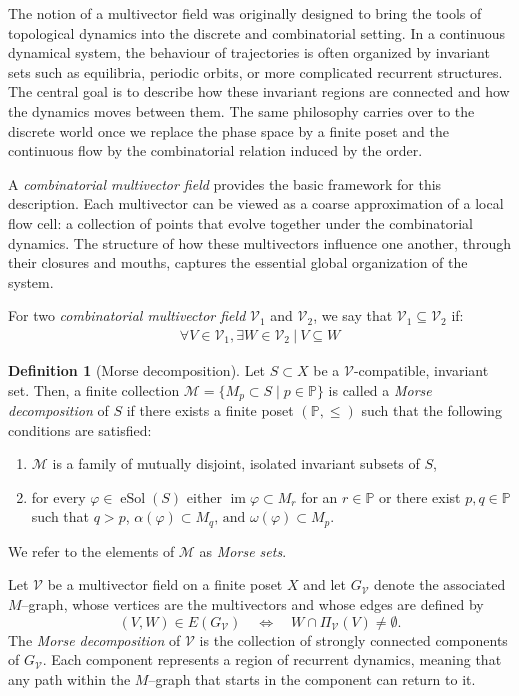 \documentclass{article}
\theoremstyle{definition}
\newtheorem{definition}{Definition}
\theoremstyle{plain}
\theoremstyle{remark}
\newcommand{\1}{\mathbbm{1}}  %
\newcommand{\img}{\operatorname{im}}
\newcommand{\esol}{\operatorname{eSol}}
\def\cV{\text{$\mathcal V$}}
\begin{document}
The notion of a multivector field was originally designed to bring the
tools of topological dynamics into the discrete and combinatorial
setting.  In a continuous dynamical system, the behaviour of trajectories
is often organized by invariant sets such as equilibria, periodic
orbits, or more complicated recurrent structures.  The central goal is
to describe how these invariant regions are connected and how the
dynamics moves between them.  The same philosophy carries over to the
discrete world once we replace the phase space by a finite poset and the
continuous flow by the combinatorial relation induced by the order.

A \emph{combinatorial multivector field} provides the basic framework for
this description.  Each multivector can be viewed as a coarse
approximation of a local flow cell: a collection of points that evolve
together under the combinatorial dynamics.  The structure of how these
multivectors influence one another, through their closures and mouths,
captures the essential global organization of the system.

For two \emph{combinatorial multivector field} $\mathcal{V}_1$ and $\mathcal{V}_2$, we say that $\mathcal{V}_1\subseteq\mathcal{V}_2$ if:
\begin{align*}
    \forall V \in \mathcal{V}_1, \exists W\in \mathcal{V}_2~|~ V\subseteq W
\end{align*}

\begin{definition}[Morse decomposition]
Let $S\subset X$ be a $\cV$-compatible, invariant set.
Then, a finite collection $\mathcal{M}=\{M_p\subset S\mid p\in\mathbb{P}\}$ is called a \emph{Morse decomposition} of $S$ if there exists a finite poset $(\mathbb{P},\le)$ such that the following conditions are satisfied:
\begin{enumerate}[label=(\roman*)]
    \item $\mathcal{M}$ is a family of mutually disjoint, isolated invariant subsets of $S$,
    \item for every $\varphi\in\esol(S)$ either $\img\varphi \subset M_r$  for an $r \in \mathbb{P}$
or there exist $p, q \in \mathbb{P}$ such that $q > p$,    $\alpha(\varphi)\subset M_q \text{, and } \omega(\varphi)\subset M_p$.
 \end{enumerate}
We refer to the elements of $\mathcal{M}$ as \emph{Morse sets}.
\end{definition}




Let $\mathcal{V}$ be a multivector field on a finite poset $X$ and let
$G_{\mathcal{V}}$ denote the associated $M$--graph, whose vertices are
the multivectors and whose edges are defined by
\[
(V,W)\in E(G_{\mathcal{V}})\quad \Longleftrightarrow \quad
W\cap \Pi_{\mathcal{V}}(V)\neq\emptyset.
\]
The \emph{Morse decomposition} of $\mathcal{V}$ is the collection of
strongly connected components of $G_{\mathcal{V}}$.  Each component
represents a region of recurrent dynamics, meaning that any path within
the $M$--graph that starts in the component can return to it. 
\end{document}
